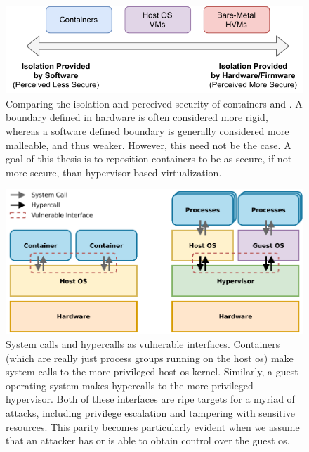 \begin{figure}[htbp]
  \centering
  \includegraphics[width=0.8\linewidth]{figs/confinement-problem/security.pdf}
  \caption[Comparing the isolation and perceived security of containers and ]{
    Comparing the isolation and perceived security of containers and
    . A boundary defined in hardware is often considered more rigid,
    whereas a software defined boundary is generally considered more malleable, and thus
    weaker. However, this need not be the case. A goal of this thesis is to reposition
    containers to be as secure, if not more secure, than hypervisor-based virtualization.
  }%
  \label{fig:container-hvm-security}
\end{figure}

\begin{figure}[htbp]
  \centering
  \includegraphics[width=0.8\linewidth]{figs/confinement-problem/syscall-hypercall.pdf}
  \caption[System calls and hypercalls as vulnerable interfaces]{
    System calls and hypercalls as vulnerable interfaces. Containers (which are really
    just process groups running on the host \gls{os}) make system calls to the
    more-privileged host \gls{os} kernel. Similarly, a guest operating system makes
    hypercalls to the more-privileged hypervisor. Both of these interfaces are ripe
    targets for a myriad of attacks, including privilege escalation and tampering with
    sensitive resources. This parity becomes particularly evident when we assume that an
    attacker has or is able to obtain control over the guest \gls{os}.
  }%
  \label{fig:syscall-hypercall}
\end{figure}

